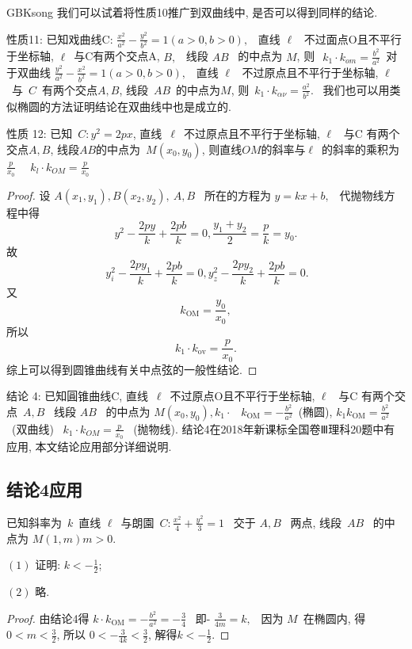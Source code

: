 \documentclass[a4paper, 12pt, twoside]{ctexart}
\begin{document}
\begin{CJK*}{GBK}{song}
    我们可以试着将性质10推广到双曲线中, 是否可以得到同样的结论.

    性质11: 已知戏曲线C:  $\frac{x^2}{a^2}-\frac{y^2}{b^2}=1(a>0,  b>0), $~ 直线 $\ell$~ 不过面点O且不平行于坐标轴,  $\ell$~与C有两个交点A,  $B, $~ 线段 $A B$~ 的中点为 $M$,  则~$\ k_{1} \cdot k_{o m}=\frac{b^2}{a^2}$~对于双曲线 $\frac{y^2}{a^2}-\frac{x^2}{b^2}=1(a>0,  b>0), $~ 直线 $\ell$~ 不过原点且不平行于坐标轴, $\ell$~与~$C$~有两个交点$A,B$, 线段~$AB$~的中点为$M$, 则~$k_{1} \cdot k_{\alpha \nu}=\frac{a^2}{b^2} .$~ 我们也可以用类似椭圆的方法证明结论在双曲线中也是成立的.

    性质 12: 已知~$C: y^2 =2px$,  直线~$\ell$~不过原点且不平行于坐标轴,   $\ell$~ 与C 有两个交点$A, B$,  线段$AB$的中点为~$M(x_0, y_0)$,  则直线$OM$的斜率与$\ell$~的斜率的乘积为 $\frac{p}{x_0}$~
~$k_{l}\cdot k_{O M}=\frac{p}{x_0} $~

    \begin{proof}
        设 $A(x_1, y_1),  B(x_2,y_2),  \ A,  B$~ 所在的方程为 $y=k x+b, $~ 代抛物线方程中得
        $$y^2-\frac{2 p y}{k}+\frac{2 p b}{k}=0,
        \frac{y_{1}+y_{2}}{2}=\frac{p}{k}=y_0.$$
    故
        $$~y_{i}^{2}-\frac{2 p y_{1}}{k}+\frac{2 p b}{k}=0,y_{z}^{2}-\frac{2 p y_{2}}{k}+\frac{2 p b}{k}=0.$$
    又
        $$k_{\mathrm{OM}}=\frac{y_0}{x_0},$$
    所以
        $$k_{1} \cdot k_{\mathrm{ov}}=\frac{p}{x_0}.$$
    综上可以得到圆锥曲线有关中点弦的一般性结论.
    \end{proof}

    结论 4: 已知圓锥曲线C,  直线~$\ell$~不过原点O且不平行于坐标轴,  $\ell$~ 与C 有两个交点~$A,  B$~ 线段 $A B$~ 的中点为 $M(x_0, y_0),  k_{1} \cdot$~ $k_{\mathrm{OM}}=-\frac{b^2}{a^2}$~(椭圆),
 $k_{1} k_{\mathrm{OM}}=\frac{b^2}{a^2} $~(双曲线)
~$k_{1} \cdot k_{OM}=\frac{p}{x_0}$~ (抛物线).
 结论4在2018年新课标全国卷Ⅲ理科20题中有应用,  本文结论应用部分详细说明.
\subsection{结论4应用}
    \begin{exa}[2018年新课标全国卷Ⅲ理数第20题]
        已知斜率为~$k$~直线 $\ell$~与朗園~$C: \frac{x^2}{4}+\frac{y^2}{3}=1$~ 交于 $A,  B$~ 两点,  线段~$A B$~ 的中点为 $M(1, m)m>0$.

        $(1)$ 证明:  $k<-\frac{1}{2}$;
        \par $(2)$ 略.
    \end{exa}
    \begin{proof}由结论4得
 $k \cdot k_{\mathrm{OM}}=-\frac{b^2}{a^2}=-\frac{3}{4}$~
 即- $\frac{3}{4 m}=k, $~ 因为 $M$~在椭圆内, 得$0<m<\frac{3}{2}$, 所以 $0<-\frac{3}{4 k}<\frac32$, 解得$k<-\frac12$.
\end{proof}


\end{CJK*}
\end{document}
